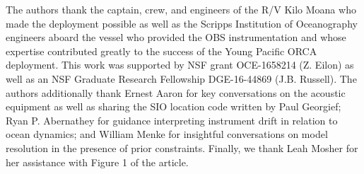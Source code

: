 The authors thank the captain, crew, and engineers of the R/V Kilo Moana who made the deployment possible as well as the Scripps Institution of Oceanography engineers aboard the vessel who provided the OBS instrumentation and whose expertise contributed greatly to the success of the Young Pacific ORCA deployment. This work was supported by NSF grant OCE-1658214 (Z. Eilon) as well as an NSF Graduate Research Fellowship DGE-16-44869 (J.B. Russell). The authors additionally thank Ernest Aaron for key conversations on the acoustic equipment as well as sharing the SIO location code written by Paul Georgief; Ryan P. Abernathey for guidance interpreting instrument drift in relation to ocean dynamics; and William Menke for insightful conversations on model resolution in the presence of prior constraints. Finally, we thank Leah Mosher for her assistance with Figure 1 of the article.